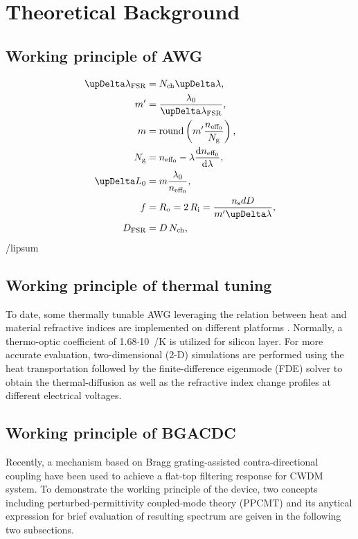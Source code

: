 
\chapter{Theoretical Background} \label{chap:2}
\section{Working principle of AWG}\label{sec:2.1}
    \lipsum
    \begin{align}
        \upDelta \lambda_\text{FSR} &= N_\text{ch} \upDelta \lambda\text{,}\label{eq:awg-DFSRLamFSR}\\
        m' &= \frac{\lambda_0}{\upDelta \lambda_\text{FSR}}\text{,}\label{eq:awg-m'}\\
        m &= \text{round}\left(m' \frac{n_{\text{eff}_0}}{N_\ur{\text{g}}}\right)\text{,}\label{eq:awg-m}\\
        N_\text{g} &= n_{\text{eff}_0} - \lambda \frac{\mathrm{d}n_{\text{eff}_0}}{\mathrm{d}\lambda}\text{,}\label{eq:awg-Na}\\
        \upDelta L_\text{0} &= m \frac{\lambda_0}{n_{\text{eff}_0}}\text{,}\label{eq:awg-dL}\\
        f& = R_\text{o} = 2\,R_\text{i} = \frac{n_\text{s}d D}{m' \upDelta \lambda}\text{,}\label{eq:awg-Ro}\\
        D_\text{FSR} &= D\,N_\text{ch}\text{,}\label{eq:awg-DFSR}
    \end{align}
    /lipsum

\section{Working principle of thermal tuning} \label{sec:2.2}
    To date, some thermally tunable AWG leveraging the relation between heat and material refractive indices are implemented on different platforms 
    \cite{TTAWG-p1, TTAWG-p2, TTAWG-p3, TTAWG-n1, TTAWG-n2, TBDTAWG}. 
    Normally, a thermo-optic coefficient of 1.68$\cdot$10~/K is utilized for silicon layer.
    For more accurate evaluation, two-dimensional (2-D) simulations are performed using the heat transportation 
    followed by the finite-difference eigenmode (FDE) solver 
    to obtain the thermal-diffusion as well as the refractive index change profiles at different electrical voltages. 

\section{Working principle of BGACDC} \label{sec:2.3}
    Recently, 
    a mechanism based on Bragg grating-assisted contra-directional coupling have been used to achieve a flat-top filtering response for CWDM system. 
    To demonstrate the working principle of the device, 
    two concepts including perturbed-permittivity coupled-mode theory (PPCMT) and its anytical expression for brief evaluation of resulting spectrum 
    are geiven in the following two subsections.

